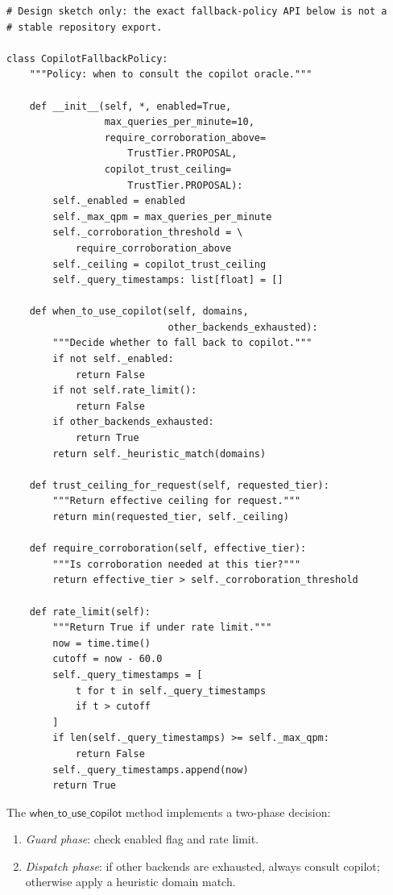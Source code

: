 \documentclass[11pt]{article}
\begin{document}
\begin{lstlisting}[style=jugeo-python,caption={Copilot fallback-policy sketch.}]
# Design sketch only: the exact fallback-policy API below is not a
# stable repository export.

class CopilotFallbackPolicy:
    """Policy: when to consult the copilot oracle."""

    def __init__(self, *, enabled=True,
                 max_queries_per_minute=10,
                 require_corroboration_above=
                     TrustTier.PROPOSAL,
                 copilot_trust_ceiling=
                     TrustTier.PROPOSAL):
        self._enabled = enabled
        self._max_qpm = max_queries_per_minute
        self._corroboration_threshold = \
            require_corroboration_above
        self._ceiling = copilot_trust_ceiling
        self._query_timestamps: list[float] = []

    def when_to_use_copilot(self, domains,
                            other_backends_exhausted):
        """Decide whether to fall back to copilot."""
        if not self._enabled:
            return False
        if not self.rate_limit():
            return False
        if other_backends_exhausted:
            return True
        return self._heuristic_match(domains)

    def trust_ceiling_for_request(self, requested_tier):
        """Return effective ceiling for request."""
        return min(requested_tier, self._ceiling)

    def require_corroboration(self, effective_tier):
        """Is corroboration needed at this tier?"""
        return effective_tier > self._corroboration_threshold

    def rate_limit(self):
        """Return True if under rate limit."""
        now = time.time()
        cutoff = now - 60.0
        self._query_timestamps = [
            t for t in self._query_timestamps
            if t > cutoff
        ]
        if len(self._query_timestamps) >= self._max_qpm:
            return False
        self._query_timestamps.append(now)
        return True
\end{lstlisting}

The $\mathsf{when\_to\_use\_copilot}$ method implements a
two-phase decision:
\begin{enumerate}
  \item \emph{Guard phase}: check enabled flag and rate limit.
  \item \emph{Dispatch phase}: if other backends are exhausted,
    always consult copilot; otherwise apply a heuristic domain
    match.
\end{enumerate}
\end{document}
